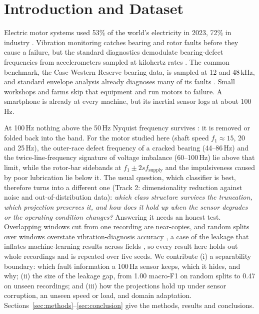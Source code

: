 
\section{Introduction and Dataset}\label{sec:intro}

Electric motor systems used 53\% of the world's electricity in 2023, 72\% in industry
\cite{iea2025}. Vibration monitoring catches bearing and rotor faults before they cause a
failure, but the standard diagnostics demodulate bearing-defect frequencies from accelerometers
sampled at kilohertz rates \cite{randall2011}. The common benchmark, the Case Western Reserve
bearing data, is sampled at 12 and 48\,kHz, and standard envelope analysis already diagnoses
many of its faults \cite{smith2015}. Small workshops and farms skip that equipment and run motors to
failure. A smartphone is already at every machine, but its inertial sensor logs at about 100\,Hz.

At 100\,Hz nothing above the 50\,Hz Nyquist frequency survives \cite{shannon1949}: it is removed
or folded back into the band. For the motor studied here (shaft speed $f_1 \approx 15$, 20 and 25\,Hz), the
outer-race defect frequency of a cracked bearing (44--86\,Hz) and the twice-line-frequency
signature of voltage imbalance (60--100\,Hz) lie above that limit, while the rotor-bar sidebands
at $f_1 \pm 2sf_\mathrm{supply}$ \cite{nandi2005} and the impulsiveness caused by poor lubrication
lie below it.
The usual question, which classifier is best, therefore turns into a different one (Track 2:
dimensionality reduction against noise and out-of-distribution data): \emph{which class
structure survives the truncation, which projection preserves it, and how does it hold up when
the sensor degrades or the operating condition changes?} Answering it needs an honest test.
Overlapping windows cut from one recording are near-copies, and random splits over windows
overstate vibration-diagnosis accuracy \cite{wheat2024}, a case of the leakage that inflates
machine-learning results across fields \cite{kapoor2023}, so every result here holds out whole
recordings and is repeated over five seeds. We contribute (i) a separability boundary: which
fault information a 100\,Hz sensor keeps, which it hides, and why; (ii) the size of the leakage
gap, from 1.00 macro-F1 on random splits to 0.47 on unseen recordings; and (iii) how the
projections hold up under sensor corruption, an unseen speed or load, and domain adaptation.
Sections~\ref{sec:methods}--\ref{sec:conclusion} give the methods, results and conclusions.

